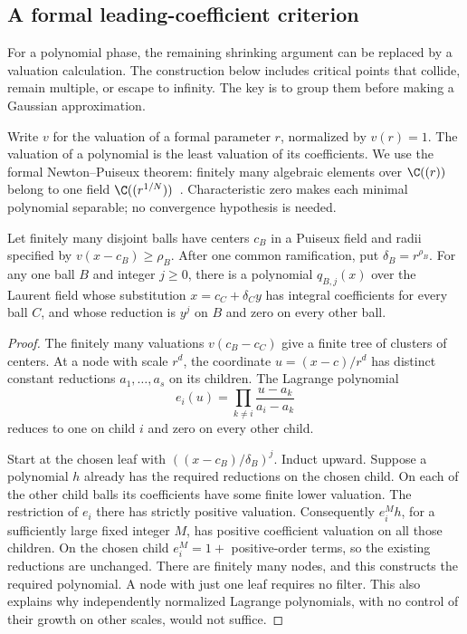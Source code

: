 \subsection{A formal leading-coefficient criterion}\label{sec:stationaryballs}

For a polynomial phase, the remaining shrinking argument can be
replaced by a valuation calculation. The construction below includes
critical points that collide, remain multiple, or escape to infinity.
The key is to group them before making a Gaussian approximation.

Write $v$ for the valuation of a formal parameter $r$, normalized by
$v(r)=1$. The valuation of a polynomial is the least valuation of its
coefficients. We use the formal Newton--Puiseux theorem: finitely many
algebraic elements over $\C((r))$ belong to one field
$\C((r^{1/N}))$~\cite[Corollary~1.10]{MannaaCoquand}.
Characteristic zero makes each minimal polynomial separable;
no convergence hypothesis is needed.

\begin{lemma}\label{lem:ballseparation}
Let finitely many disjoint balls have centers $c_B$ in a Puiseux field
and radii specified by $v(x-c_B)\geq\rho_B$. After one common
ramification, put $\delta_B=r^{\rho_B}$. For any one ball $B$ and
integer $j\geq0$, there is a polynomial $q_{B,j}(x)$ over the Laurent
field whose substitution $x=c_C+\delta_C y$ has integral coefficients
for every ball $C$, and whose reduction is $y^j$ on $B$ and zero on
every other ball.
\end{lemma}
\begin{proof}
The finitely many valuations $v(c_B-c_C)$ give a finite tree of
clusters of centers. At a node with scale $r^d$, the coordinate
$u=(x-c)/r^d$ has distinct constant reductions $a_1,\ldots,a_s$
on its children. The Lagrange polynomial
\[
 e_i(u)=\prod_{k\ne i}\frac{u-a_k}{a_i-a_k}
\]
reduces to one on child $i$ and zero on every other child.

Start at the chosen leaf with $((x-c_B)/\delta_B)^j$. Induct upward.
Suppose a polynomial $h$ already has the required reductions on the
chosen child. On each of the other child balls its coefficients have
some finite lower valuation. The restriction of $e_i$ there has
strictly positive valuation. Consequently $e_i^M h$, for a sufficiently
large fixed integer $M$, has positive coefficient valuation on all
those children. On the chosen child $e_i^M=1+$ positive-order terms,
so the existing reductions are unchanged. There are finitely many
nodes, and this constructs the required polynomial. A node with just
one leaf requires no filter. This also explains why independently
normalized Lagrange polynomials, with no control of their growth on
other scales, would not suffice.
\end{proof}

